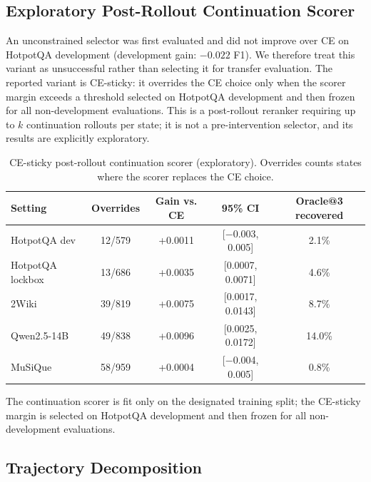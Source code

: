\documentclass[10pt]{article}
\begin{document}
\subsection{Exploratory Post-Rollout Continuation Scorer}
\label{sec:scorer}

An unconstrained selector was first evaluated and did not improve over CE on
HotpotQA development (development gain: $-0.022$ F1). We therefore treat
this variant as unsuccessful rather than selecting it for transfer
evaluation. The reported variant is CE-sticky: it overrides the CE choice
only when the scorer margin exceeds a threshold selected on HotpotQA
development and then frozen for all non-development evaluations. This is a
post-rollout reranker requiring up to $k$ continuation rollouts per state;
it is not a pre-intervention selector, and its results are explicitly
exploratory.

\begin{table}[h]
\centering
\small
\caption{CE-sticky post-rollout continuation scorer (exploratory).
Overrides counts states where the scorer replaces the CE choice.}
\label{tab:scorer}
\begin{tabular}{lcccc}
\toprule
\textbf{Setting} & \textbf{Overrides} & \textbf{Gain vs. CE} &
\textbf{95\% CI} & \textbf{Oracle@3 recovered} \\
\midrule
HotpotQA dev     & 12/579 & +0.0011 & [$-$0.003, 0.005]  & 2.1\% \\
HotpotQA lockbox & 13/686 & +0.0035 & [0.0007, 0.0071]   & 4.6\% \\
2Wiki            & 39/819 & +0.0075 & [0.0017, 0.0143]   & 8.7\% \\
Qwen2.5-14B      & 49/838 & +0.0096 & [0.0025, 0.0172]   & 14.0\% \\
MuSiQue          & 58/959 & +0.0004 & [$-$0.004, 0.005]  & 0.8\% \\
\bottomrule
\end{tabular}
\end{table}

\noindent
The continuation scorer is fit only on the designated training split; the
CE-sticky margin is selected on HotpotQA development and then frozen for all
non-development evaluations.

\subsection{Trajectory Decomposition}
\label{sec:trajdecomp}
\end{document}
